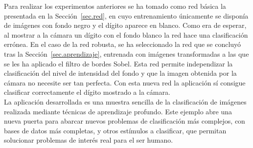 Para realizar los experimentos anteriores se ha tomado como red básica la presentada en la Sección~\ref{sec.red}, en cuyo entrenamiento únicamente se disponía de imágenes con fondo negro y el dígito aparece en blanco. Como era de esperar, al mostrar a la cámara un dígito con el fondo blanco la red hace una clasificación errónea. En el caso de la red robusta, se ha seleccionado la red que se concluyó tras la Sección~\ref{sec.aprendizaje}, entrenada con imágenes transformadas a las que se les ha aplicado el filtro de bordes Sobel. Esta red permite independizar la clasificación del nivel de intensidad del fondo y que la imagen obtenida por la cámara no necesite ser tan perfecta. Con esta nueva red la aplicación sí consigue clasificar correctamente el dígito mostrado a la cámara.\\

La aplicación desarrollada es una muestra sencilla de la clasificación de imágenes realizada mediante técnicas de aprendizaje profundo. Este ejemplo abre una nueva puerta para abarcar nuevos problemas de clasificación más complejos, con bases de datos más completas, y otros estímulos a clasificar, que permitan solucionar problemas de interés real para el ser humano.
